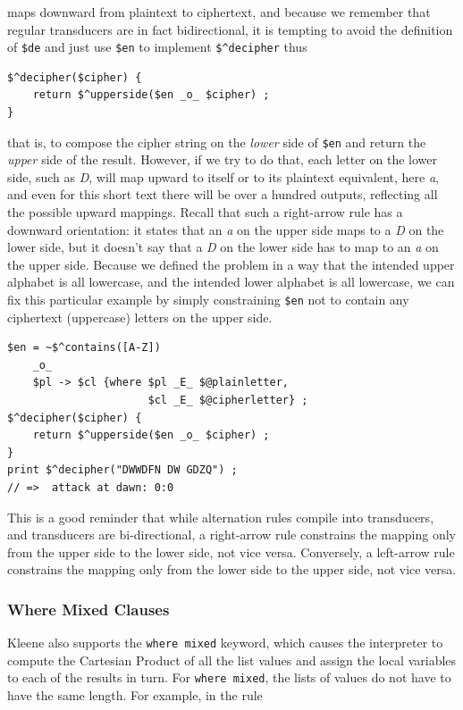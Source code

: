\noindent
maps downward from plaintext to ciphertext, and because we remember that regular transducers are in fact bidirectional, it
is tempting to avoid the definition of \verb!$de! and just use \verb!$en! to implement \verb!$^decipher! thus


\begin{Verbatim}
$^decipher($cipher) {
    return $^upperside($en _o_ $cipher) ;
}
\end{Verbatim}

\noindent
that is, to compose the cipher string on the \emph{lower} side of \verb!$en! and return the \emph{upper} side of the
result.  However, if we try to do that, each letter on the lower side, such as \emph{D}, will map upward to itself or to its
plaintext equivalent, here \emph{a}, and even for this short text there will be over a hundred outputs, reflecting all the
possible upward mappings.  Recall that such
a right-arrow rule has a downward orientation:  it states that an \emph{a} on the upper side maps to a \emph{D} on the
lower side, but it doesn't say that a \emph{D} on the lower side has to map to an \emph{a} on the upper side.  Because we
defined the problem in a way that the intended upper alphabet is all lowercase, and the intended lower alphabet is all
lowercase, we can fix
this particular example by simply constraining \verb!$en! not to contain any ciphertext (uppercase) letters on the upper side.

\begin{Verbatim}
$en = ~$^contains([A-Z])
	_o_
	$pl -> $cl {where $pl _E_ $@plainletter,
                      $cl _E_ $@cipherletter} ;
$^decipher($cipher) {
    return $^upperside($en _o_ $cipher) ;
}
print $^decipher("DWWDFN DW GDZQ") ;
// =>  attack at dawn: 0:0
\end{Verbatim}

\noindent
This is a good reminder that while alternation rules compile into transducers, and transducers are bi-directional, a
right-arrow rule constrains the mapping only from the upper side to the
lower side, not vice versa.  Conversely, a left-arrow rule constrains
the mapping only from the lower side to the upper side, not vice versa.


\subsubsection{Where Mixed Clauses}

Kleene also supports the \texttt{where mixed} keyword, which causes the interpreter to compute the Cartesian Product
of all the list values and assign the local variables to each of the
results in turn.  For \texttt{where mixed}, the lists of values do not have
to have the same length.  For example, in the rule

